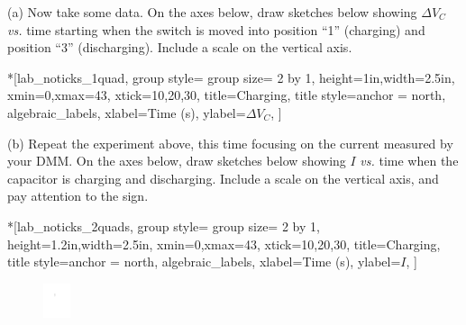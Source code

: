 (a)  Now take some data.  On the axes below, draw sketches below showing $\Delta V_C$ \textit{vs.} time starting when the switch is moved into position ``1'' (charging) and position ``3'' (discharging).  Include a scale on the vertical axis.


\begin{lab_groupplot}*{}[lab_noticks_1quad,
	group style={
		group size= 2 by 1},
	height=1in,width=2.5in,
	xmin=0,xmax=43,
	xtick={10,20,30},
	title=Charging,
	title style={anchor = north},
	algebraic_labels,
	xlabel=Time (s),
	ylabel=$\Delta V_C$,
]
\nextgroupplot[title=Charging]
\nextgroupplot[title=Discharging]
\end{lab_groupplot}


(b) Repeat the experiment above, this time focusing on the current measured by your DMM.  On the axes below, draw sketches below showing $I$ \textit{vs.} time when the capacitor is charging and discharging.  Include a scale on the vertical axis, and pay attention to the sign.


\begin{lab_groupplot}*{}[lab_noticks_2quads,
	group style={
		group size= 2 by 1},
	height=1.2in,width=2.5in,
	xmin=0,xmax=43,
	xtick={10,20,30},
	title=Charging,
	title style={anchor = north},
	algebraic_labels,
	xlabel=Time (s),
	ylabel=\hspace*{15.71pt}$I$,  %
]
\nextgroupplot[title=Charging]
\nextgroupplot[title=Discharging]
\end{lab_groupplot}



\begin{figure}
    \vspace{-0.2 in}
\includegraphics[width=0.07\textwidth]{rc_circuits/shorted_resistor_bw.pdf}
\end{figure}


